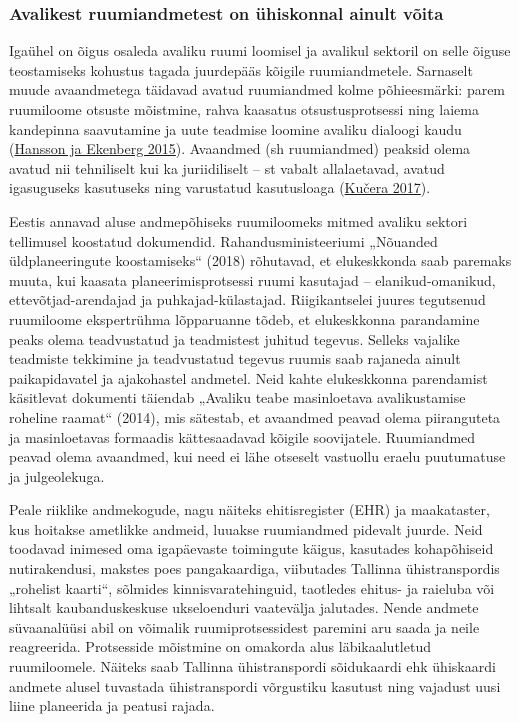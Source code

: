 \documentclass[estonian,]{article}
\begin{document}
\hypertarget{avalikest-ruumiandmetest-on-uxfchiskonnal-ainult-vuxf5ita}{%
\subsubsection*{Avalikest ruumiandmetest on ühiskonnal ainult võita}\label{avalikest-ruumiandmetest-on-uxfchiskonnal-ainult-vuxf5ita}}

Igaühel on õigus osaleda avaliku ruumi loomisel ja avalikul sektoril on selle õiguse teostamiseks kohustus tagada juurdepääs kõigile ruumiandmetele. Sarnaselt muude avaandmetega täidavad avatud ruumiandmed kolme põhieesmärki: parem ruumiloome otsuste mõistmine, rahva kaasatus otsustusprotsessi ning laiema kandepinna saavutamine ja uute teadmise loomine avaliku dialoogi kaudu (\protect\hyperlink{Hansson2015}{Hansson ja Ekenberg 2015}). Avaandmed (sh ruumiandmed) peaksid olema avatud nii tehniliselt kui ka juriidiliselt -- st vabalt allalaetavad, avatud igasuguseks kasutuseks ning varustatud kasutusloaga (\protect\hyperlink{Kuux10dera2017}{Kučera 2017}).

Eestis annavad aluse andmepõhiseks ruumiloomeks mitmed avaliku sektori tellimusel koostatud dokumendid. Rahandusministeeriumi „Nõuanded üldplaneeringute koostamiseks`` (2018) rõhutavad, et elukeskkonda saab paremaks muuta, kui kaasata planeerimisprotsessi ruumi kasutajad -- elanikud-omanikud, ettevõtjad-arendajad ja puhkajad-külastajad. Riigikantselei juures tegutsenud ruumiloome ekspertrühma lõpparuanne tõdeb, et elukeskkonna parandamine peaks olema teadvustatud ja teadmistest juhitud tegevus. Selleks vajalike teadmiste tekkimine ja teadvustatud tegevus ruumis saab rajaneda ainult paikapidavatel ja ajakohastel andmetel. Neid kahte elukeskkonna parendamist käsitlevat dokumenti täiendab „Avaliku teabe masinloetava avalikustamise roheline raamat`` (2014), mis sätestab, et avaandmed peavad olema piiranguteta ja masinloetavas formaadis kättesaadavad kõigile soovijatele. Ruumiandmed peavad olema avaandmed, kui need ei lähe otseselt vastuollu eraelu puutumatuse ja julgeolekuga.

Peale riiklike andmekogude, nagu näiteks ehitisregister (EHR) ja maakataster, kus hoitakse ametlikke andmeid, luuakse ruumiandmed pidevalt juurde. Neid toodavad inimesed oma igapäevaste toimingute käigus, kasutades kohapõhiseid nutirakendusi, makstes poes pangakaardiga, viibutades Tallinna ühistranspordis „rohelist kaarti``, sõlmides kinnisvaratehinguid, taotledes ehitus- ja raieluba või lihtsalt kaubanduskeskuse ukseloenduri vaatevälja jalutades. Nende andmete süvaanalüüsi abil on võimalik ruumiprotsessidest paremini aru saada ja neile reagreerida. Protsesside mõistmine on omakorda alus läbikaalutletud ruumiloomele. Näiteks saab Tallinna ühistranspordi sõidukaardi ehk ühiskaardi andmete alusel tuvastada ühistranspordi võrgustiku kasutust ning vajadust uusi liine planeerida ja peatusi rajada.
\end{document}

